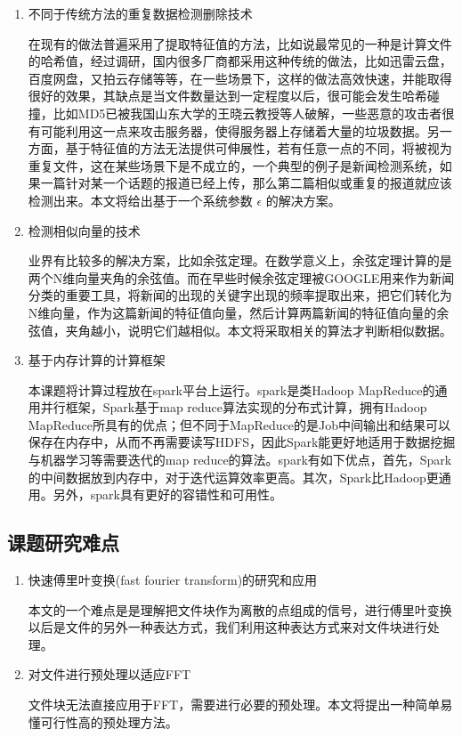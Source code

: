 \begin{enumerate}
\item 不同于传统方法的重复数据检测删除技术

在现有的做法普遍采用了提取特征值的方法，比如说最常见的一种是计算文件的哈希值，经过调研，国内很多厂商都采用这种传统的做法，比如迅雷云盘，百度网盘，又拍云存储等等，在一些场景下，这样的做法高效快速，并能取得很好的效果，其缺点是当文件数量达到一定程度以后，很可能会发生哈希碰撞，比如MD5已被我国山东大学的王晓云教授等人破解，一些恶意的攻击者很有可能利用这一点来攻击服务器，使得服务器上存储着大量的垃圾数据。另一方面，基于特征值的方法无法提供可伸展性，若有任意一点的不同，将被视为重复文件，这在某些场景下是不成立的，一个典型的例子是新闻检测系统，如果一篇针对某一个话题的报道已经上传，那么第二篇相似或重复的报道就应该检测出来。本文将给出基于一个系统参数 $\epsilon$ 的解决方案。

\item 检测相似向量的技术

业界有比较多的解决方案，比如余弦定理。在数学意义上，余弦定理计算的是两个N维向量夹角的余弦值。而在早些时候余弦定理被GOOGLE用来作为新闻分类的重要工具，将新闻的出现的关键字出现的频率提取出来，把它们转化为N维向量，作为这篇新闻的特征值向量，然后计算两篇新闻的特征值向量的余弦值，夹角越小，说明它们越相似。本文将采取相关的算法才判断相似数据。

\item 基于内存计算的计算框架

本课题将计算过程放在spark平台上运行。spark是类Hadoop MapReduce的通用并行框架，Spark基于map reduce算法实现的分布式计算，拥有Hadoop MapReduce所具有的优点；但不同于MapReduce的是Job中间输出和结果可以保存在内存中，从而不再需要读写HDFS，因此Spark能更好地适用于数据挖掘与机器学习等需要迭代的map reduce的算法。spark有如下优点，首先，Spark的中间数据放到内存中，对于迭代运算效率更高。其次，Spark比Hadoop更通用。另外，spark具有更好的容错性和可用性。

\end{enumerate}

\subsection{课题研究难点}
\label{sec:point2}

\begin{enumerate}
\item 快速傅里叶变换(fast fourier transform)的研究和应用

本文的一个难点是是理解把文件块作为离散的点组成的信号，进行傅里叶变换以后是文件的另外一种表达方式，我们利用这种表达方式来对文件块进行处理。

\item 对文件进行预处理以适应FFT

文件块无法直接应用于FFT，需要进行必要的预处理。本文将提出一种简单易懂可行性高的预处理方法。
\end{enumerate}

